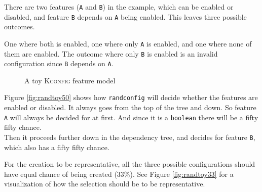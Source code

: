 \documentclass[a4paper,11pt]{report}
\newcommand{\figa}{
    \begin{figure}[!htpb]
    \centering
}
\newcommand{\figb}[2]{
    \caption{#1}
    \label{#2}
    \end{figure}
}
\begin{document}
There are two features (\texttt{A} and \texttt{B}) in the example, which can be 
enabled or disabled, and feature \texttt{B} depends on \texttt{A} being enabled.
This leaves three possible outcomes. 

One where both is enabled, one where only \texttt{A} is enabled, and one where 
none of them are enabled. The outcome where only \texttt{B} is enabled is an 
invalid configuration since \texttt{B} depends on \texttt{A}.

\figa
    \subfigure{
        
    }
\figb{A toy \textsc{Kconfig} feature model}{randconfigtoy}

Figure \ref{fig:randtoy50} shows how \texttt{randconfig} will decide whether 
the features are enabled or disabled. It always goes from the top of the tree 
and down. So feature \texttt{A} will always be decided for at first. And since 
it is a \texttt{boolean} there will be a fifty fifty chance.
\\

Then it proceeds further down in the dependency tree, and decides for feature
\texttt{B}, which also has a fifty fifty chance.

For the creation to be representative, all the three possible configurations 
should have equal chance of being created (33\%). See Figure 
\ref{fig:randtoy33} for a visualization of how the selection should 
be to be representative.
\end{document}
